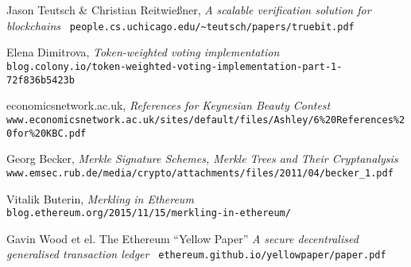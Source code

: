 \begin{thebibliography}{9}
  
  
  Jason Teutsch \& Christian Reitwießner,
  \emph{A scalable verification solution for blockchains}
  \verb| people.cs.uchicago.edu/~teutsch/papers/truebit.pdf |
  
  Elena Dimitrova,
  \emph{Token-weighted voting implementation}
  \verb| blog.colony.io/token-weighted-voting-implementation-part-1-72f836b5423b |
  
  economicsnetwork.ac.uk,
  \emph{References for Keynesian Beauty Contest}
  \verb| www.economicsnetwork.ac.uk/sites/default/files/Ashley/6%20References%20for%20KBC.pdf |

  Georg Becker,
  \emph{Merkle Signature Schemes, Merkle Trees and Their Cryptanalysis}
  \verb| www.emsec.rub.de/media/crypto/attachments/files/2011/04/becker_1.pdf |

  Vitalik Buterin,
  \emph{Merkling in Ethereum}
  \verb| blog.ethereum.org/2015/11/15/merkling-in-ethereum/ |
  
  Gavin Wood et el.
  The Ethereum ``Yellow Paper''
  \emph{A secure decentralised generalised transaction ledger}
  \verb| ethereum.github.io/yellowpaper/paper.pdf |
  

\end{thebibliography}